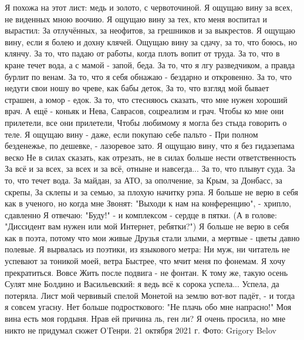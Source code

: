 Я похожа на этот лист: медь и золото, с червоточиной.
Я ощущаю вину за всех, не виденных мною воочию.
Я ощущаю вину за тех, кто меня воспитал и вырастил:
За отлучённых, за неофитов, за грешников и за выкрестов.
Я ощущаю вину, если я болею и дохну клячей.
Ощущаю вину за сдачу, за то, что боюсь, но клянчу.
За то, что падаю от работы, когда плоть вопит от труда.
За то, что в кране течет вода, а с мамой - запой, беда.
За то, что я лгу разведчиком, а правда бурлит по венам.
За то, что я себя обнажаю - бездарно и откровенно.
За то, что недуги свои ношу во чреве, как бабы деток,
За то, что взгляд мой бывает страшен, а юмор - едок.
За то, что стесняюсь сказать, что мне нужен хороший врач.
А ещё -  коньяк и Нева, Саврасов, соцреализм и грач.
Чтобы ко мне они прилетели, все они прилетели,
Чтобы любимому я могла без стыда говорить о теле.
Я ощущаю вину - даже, если покупаю себе пальто -
При полном безденежье, по дешевке, - лазоревое зато.
Я ощущаю вину, что я без гидазепама веско
Не в силах сказать, как отрезать, не в силах больше нести ответственность
За всё и за всех, за всех и за всё, отныне и навсегда...
За то, что плывут суда. 
За то, что течет вода.
За майдан, за АТО, за ополчение, за Крым, за Донбасс, за скрепы,
За склепы и за семью, за плохую начитку рэпа.
Я больше не верю в себя как в ученого, но когда мне
Звонят: "Выходи к нам на конференцию", - хрипло, сдавленно
Я отвечаю: "Буду!" - и комплексом - сердце в пятки.
(А в голове: "Диссидент вам нужен или мой Интернет, ребятки?")
Я больше не верю в себя как в поэта, потому что мои живые
Друзья стали злыми, а мертвые - цветы давно полевые.
Я вырвалась из поэтики, из языкового метра:
Ни муж, ни читатель не успевают за тоникой моей, ветра
Быстрее, что мчит меня по фонемам. Я хочу прекратиться. Вовсе
Жить после подвига - не фонтан. К тому же, такую осень
Сулят мне Болдино и Васильевский: я ведь всё к сорока успела...
Успела, да потеряла. Лист мой червивый спелой
Монетой на землю вот-вот падёт, - и тогда я совсем угасну.
Нет больше подросткового: "Не плачь обо мне напрасно!"
Моя вина есть моя гордыня. Нрав ей причина ль, ген ли?
Я очень просила, но мне никто не придумал сюжет О'Генри.
21 октября 2021 г.
Фото: Grigory Belov
